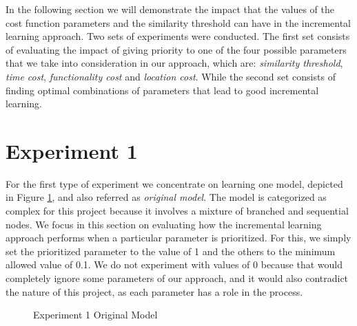 In the following section we will demonstrate the impact that the values of the cost function parameters and the similarity threshold can have in the incremental learning approach.
%
%
Two sets of experiments were conducted. The first set consists of evaluating the impact of giving priority to one of the four possible parameters that we take into consideration in our approach, which are: \textit{similarity threshold}, \textit{time cost}, \textit{functionality cost} and \textit{location cost}. While the second set consists of finding optimal combinations of parameters that lead to good incremental learning. 
%
\section{Experiment 1} 
For the first type of experiment we concentrate on learning one model, depicted in Figure \ref{experiment_model_example}, and also referred as \textit{original model}. The model is categorized as complex for this project because it involves a mixture of branched and sequential nodes.
%
We focus in this section on evaluating how the incremental learning approach performs when a particular parameter is prioritized. For this, we simply set the prioritized parameter to the value of 1 and the others to the minimum allowed value of 0.1. We do not experiment with values of 0 because that would completely ignore some parameters of our approach, and it would also contradict the nature of this project, as each parameter has a role in the process. 
%
\begin{figure}[h]
	\centering
	\caption{Experiment 1 Original Model}
	\label{experiment_model_example}
\end{figure}

